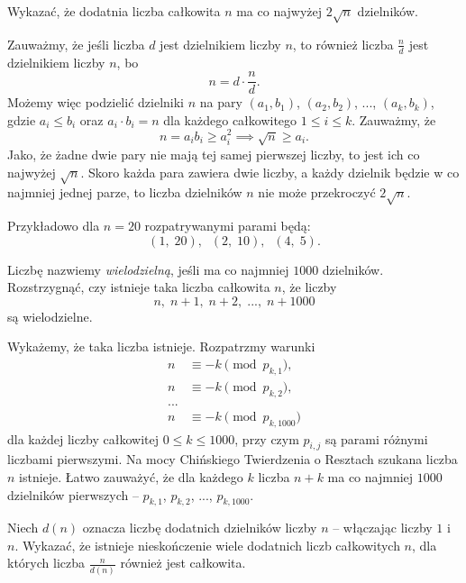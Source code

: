 \newpage
{}

\begin{problem}{1}
	Wykazać, że dodatnia liczba całkowita $n$ ma co najwyżej $2\sqrt{n}$ dzielników.
\end{problem}

\noindent
Zauważmy, że jeśli liczba $d$ jest dzielnikiem liczby $n$, to również liczba $\frac{n}{d}$ jest dzielnikiem liczby $n$, bo
\[
	n = d \cdot \frac{n}{d}.
\]
Możemy więc podzielić dzielniki $n$ na pary $(a_1, b_1)$, $(a_2, b_2)$, ..., $(a_k, b_k)$, gdzie $a_i \leqslant b_i$ oraz $a_i \cdot b_i = n$ dla każdego całkowitego $1 \leqslant i \leqslant k$. Zauważmy, że
\[
	n = a_ib_i \geqslant a_i^2 \implies \sqrt{n} \geqslant a_i.
\]
Jako, że żadne dwie pary nie mają tej samej pierwszej liczby, to jest ich co najwyżej $\sqrt{n}$. Skoro każda para zawiera dwie liczby, a każdy dzielnik będzie w co najmniej jednej parze, to liczba dzielników $n$ nie może przekroczyć $2\sqrt{n}$.

\vspace{10px}
\noindent
Przykładowo dla $n = 20$ rozpatrywanymi parami będą:
\[
	(1,\; 20), \;\; (2,\; 10), \;\; (4,\; 5).
\]

\begin{problem}{2}
	Liczbę nazwiemy \textit{wielodzielną}, jeśli ma co najmniej $1000$ dzielników. Rozstrzygnąć, czy istnieje taka liczba całkowita $n$, że liczby
	\[
		n,\; n + 1,\; n + 2,\; ...,\; n + 1000
	\]
	są wielodzielne.
\end{problem}

\noindent
Wykażemy, że taka liczba istnieje. Rozpatrzmy warunki
\begin{align*}
	n &\equiv -k \pmod{p_{k, 1}}, \\
	n &\equiv -k \pmod{p_{k, 2}}, \\
	... \\
	n &\equiv -k \pmod{p_{k, 1000}}
\end{align*}
dla każdej liczby całkowitej $0 \leqslant k \leqslant 1000$, przy czym $p_{i, j}$ są parami różnymi liczbami pierwszymi. Na mocy Chińskiego Twierdzenia o Resztach szukana liczba $n$ istnieje. Łatwo zauważyć, że dla każdego $k$ liczba $n + k$ ma co najmniej $1000$ dzielników pierwszych -- $p_{k, 1}$, $p_{k, 2}$, ..., $p_{k, 1000}$.

\begin{problem}{3}
	Niech $d(n)$ oznacza liczbę dodatnich dzielników liczby $n$ -- włączając liczby $1$ i $n$. Wykazać, że istnieje nieskończenie wiele dodatnich liczb całkowitych $n$, dla których liczba $\frac{n}{d(n)}$ również jest całkowita.
\end{problem}

